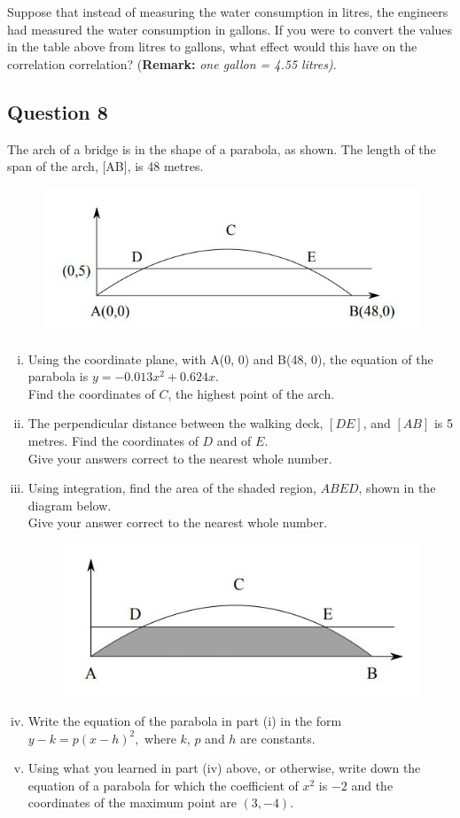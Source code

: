 \documentclass[12pt]{article}
\begin{document}
\noindent Suppose that instead of measuring the water consumption in litres, the engineers had measured the water 
consumption in gallons. If you were to convert the values in the table above from litres to gallons, what effect would this have on the correlation correlation? (\noindent \textbf{Remark:} \textit{one gallon = 4.55 litres)}.

\subsection*{Question 8}
The arch of a bridge is in the shape of a parabola, as shown. The length of
the span of the arch, [AB], is 48 metres.
\begin{figure}[h!]
\centering
\includegraphics[width=0.7\linewidth]{images/Q8a}
\end{figure}
\vspace{-0.7cm}
\begin{enumerate}[(i)]
\item Using the coordinate plane, with A(0, 0) and B(48, 0), the equation of
the parabola is $y = −0.013x^2 + 0.624x$.\\
Find the coordinates of $C$, the highest point of the arch.
\item  The perpendicular distance between the walking deck, $[DE]$, and $[AB]$
is 5 metres.
Find the coordinates of $D$ and of $E$. \\ Give your answers correct to the
nearest whole number.
\item  Using integration, find the area of the shaded region, $ABED$, shown
in the diagram below.\\
Give your answer correct to the nearest whole number.
\begin{figure}[h!]
	\centering
	\includegraphics[width=0.7\linewidth]{images/Q8b}
\end{figure}
\vspace{-0.9cm}
\item  Write the equation of the parabola in part (i) in the form
$y - k = p(x - h)^2,$ where $k$, $p$ and $h$ are constants.
\item  Using what you learned in part (iv) above, or otherwise, write down
the equation of a parabola for which the coefficient of $x^2$
is $-2$ and
the coordinates of the maximum point are $(3, -4)$.
\end{enumerate}
\end{document}
